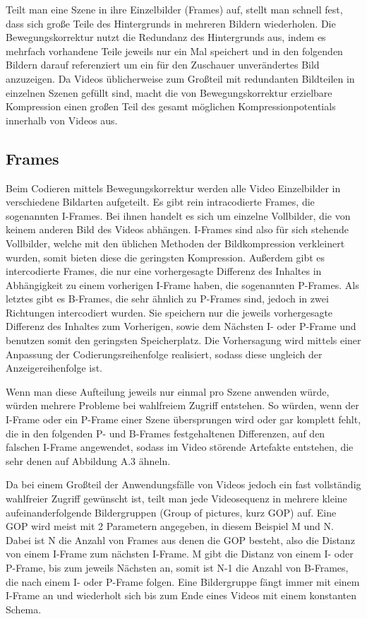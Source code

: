 Teilt man eine Szene in ihre Einzelbilder (Frames) auf, stellt man schnell fest, dass sich große Teile des Hintergrunds in mehreren Bildern wiederholen.
Die Bewegungskorrektur nutzt die Redundanz des Hintergrunds aus, indem es mehrfach vorhandene Teile jeweils nur ein Mal speichert und in den folgenden Bildern darauf referenziert um ein für den Zuschauer unverändertes Bild anzuzeigen.
Da Videos üblicherweise zum Großteil mit redundanten Bildteilen in einzelnen Szenen gefüllt sind, macht die von Bewegungskorrektur erzielbare Kompression einen großen Teil des gesamt möglichen Kompressionpotentials innerhalb von Videos aus.
\subsection{Frames}
Beim Codieren mittels Bewegungskorrektur werden alle Video Einzelbilder in verschiedene Bildarten aufgeteilt.
Es gibt rein intracodierte Frames, die sogenannten I-Frames. Bei ihnen handelt es sich um einzelne Vollbilder, die von keinem anderen Bild des Videos abhängen. I-Frames sind also für sich stehende Vollbilder, welche mit den üblichen Methoden der Bildkompression verkleinert wurden, somit bieten diese die geringsten Kompression.
Außerdem gibt es intercodierte Frames, die nur eine vorhergesagte Differenz des Inhaltes in Abhängigkeit zu einem vorherigen I-Frame haben, die sogenannten P-Frames.
Als letztes gibt es B-Frames, die sehr ähnlich zu P-Frames sind, jedoch in zwei Richtungen intercodiert wurden. Sie speichern nur die jeweils vorhergesagte Differenz des Inhaltes zum Vorherigen, sowie dem Nächsten I- oder P-Frame und benutzen somit den geringsten Speicherplatz.
Die Vorhersagung wird mittels einer Anpassung der Codierungsreihenfolge realisiert, sodass diese ungleich der Anzeigereihenfolge ist.\cite{symes_peter_digital_2004}

Wenn man diese Aufteilung jeweils nur einmal pro Szene anwenden würde, würden mehrere Probleme bei wahlfreiem Zugriff entstehen. So würden, wenn der I-Frame oder ein P-Frame einer Szene übersprungen wird oder gar komplett fehlt, die in den folgenden P- und B-Frames festgehaltenen Differenzen, auf den falschen I-Frame angewendet, sodass im Video  störende Artefakte entstehen, die sehr denen auf Abbildung A.3 ähneln.

Da bei einem Großteil der Anwendungsfälle von Videos jedoch ein fast vollständig wahlfreier Zugriff gewünscht ist, teilt man jede Videosequenz in mehrere kleine aufeinanderfolgende Bildergruppen (Group of pictures, kurz GOP) auf. Eine GOP wird meist mit 2 Parametern angegeben, in diesem Beispiel M und N.
Dabei ist N die Anzahl von Frames aus denen die GOP besteht, also die Distanz von einem I-Frame zum nächsten I-Frame.
M gibt die Distanz von einem I- oder P-Frame, bis zum jeweils Nächsten an, somit ist N-1 die Anzahl von B-Frames, die nach einem I- oder P-Frame folgen.\cite{huszak2010analysing}
Eine Bildergruppe fängt immer mit einem I-Frame an und wiederholt sich bis zum Ende eines Videos mit einem konstanten Schema.

